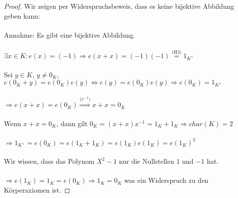 \documentclass[12pt, letterpaper]{article}
\begin{document}
\begin{proof} 
    Wir zeigen per Widerspruchsbeweis, dass es keine bijektive Abbildung geben kann:
    \\ \\
    Annahme: Es gibt eine bijektive Abbildung.
    \\ \\
    $\exists x \in K : e(x) = (-1) \Rightarrow e(x+x)=(-1)(-1) \overset{\text{(H3)}}{=} 1_{K^\times} $
    \\ \\ 
    Sei $y \in K$, $y\neq 0_K$, $e(0_K + y) = e(0_K)e(y) \Leftrightarrow  e(y) = e(0_K)e(y) \Rightarrow e(0_K) = 1_{K^\times} $
    \\ \\
    $\Rightarrow e(x+x) = e(0_K) \overset{\text{($e^{-1}$)}}{\Rightarrow} x+x = 0_K $
    \\ \\
    Wenn $x+x = 0_K$, dann gilt $0_K=(x+x)x^{-1} = 1_K+1_K \Rightarrow char(K)=2 $
    \\ \\
    $\Rightarrow 1_{K^\times} = e(0_K) = e(1_K+1_K) = e(1_K)e(1_K) = e(1_K)^2 $
    \\ \\
    Wir wissen, dass das Polynom $X^2 - 1$ nur die Nullstellen $1$ und $-1$ hat.
    \\ \\
    $\Rightarrow e(1_K) = 1_K = e(0_K) \Rightarrow 1_K = 0_K $ was ein Widerspruch zu den Körperaxiomen ist. 

   
\end{proof}
\end{document}
